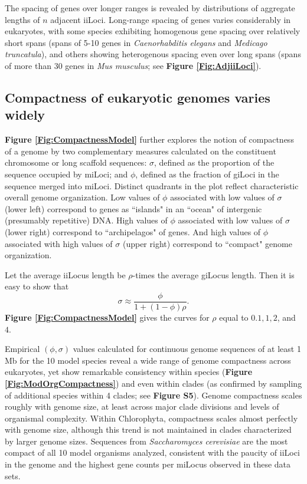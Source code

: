 The spacing of genes over longer ranges is revealed by distributions of aggregate lengths of $n$ adjacent iiLoci.
Long-range spacing of genes varies considerably in eukaryotes, with some species exhibiting homogenous gene spacing over relatively short spans (spans of 5-10 genes in \textit{Caenorhabditis elegans} and \textit{Medicago truncatula}), and others showing heterogenous spacing even over long spans (spans of more than 30 genes in \textit{Mus musculus}; see \textbf{Figure \ref{Fig:AdjiiLoci}}).

\subsection{Compactness of eukaryotic genomes varies widely}

\textbf{Figure \ref{Fig:CompactnessModel}} further explores the notion of compactness of a genome by two complementary measures calculated on the constituent chromosome or long scaffold sequences:
$\sigma$, defined as the proportion of the sequence occupied by miLoci;
and $\phi$, defined as the fraction of giLoci in the sequence merged into miLoci.
Distinct quadrants in the plot reflect characteristic overall genome organization.
Low values of $\phi$ associated with low values of $\sigma$ (lower left) correspond to genes as ``islands" in an ``ocean" of intergenic (presumably repetitive) DNA.
High values of $\phi$ associated with low values of $\sigma$ (lower right) correspond to ``archipelagos" of genes.
And high values of $\phi$ associated with high values of $\sigma$ (upper right) correspond to ``compact" genome organization.

Let the average iiLocus length be $\rho$-times the average giLocus length.
Then it is easy to show that
$$\sigma \approx \frac{\phi}{1 + (1-\phi)\rho}.$$
\textbf{Figure \ref{Fig:CompactnessModel}} gives the curves for $\rho$ equal to $0.1, 1, 2$, and $4$.

Empirical $(\phi,\sigma)$ values calculated for continuous genome sequences of at least 1 Mb for the 10 model species reveal a wide range of genome compactness across eukaryotes, yet show remarkable consistency within species (\textbf{Figure \ref{Fig:ModOrgCompactness}}) and even within clades (as confirmed by sampling of additional species within 4 clades; see \textbf{Figure S5}).
Genome compactness scales roughly with genome size, at least across major clade divisions and levels of organismal complexity.
Within Chlorophyta, compactness scales almost perfectly with genome size, although this trend is not maintained in clades characterized by larger genome sizes.
Sequences from \textit{Saccharomyces cerevisiae} are the most compact of all 10 model organisms analyzed, consistent with the paucity of iiLoci in the genome and the highest gene counts per miLocus observed in these data sets.

